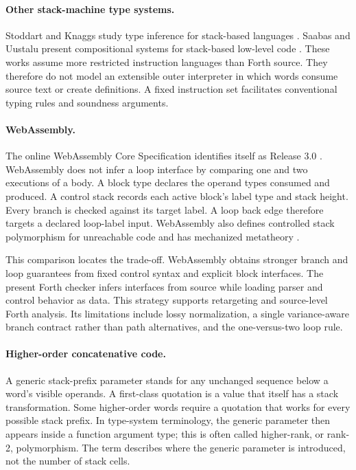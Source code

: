 \documentclass[11pt,a4paper]{article}
\begin{document}
\paragraph{Other stack-machine type systems.}
Stoddart and Knaggs study type inference for stack-based languages
\cite{stoddart1993}.  Saabas and Uustalu present compositional systems for
stack-based low-level code \cite{saabas2006}.  These works assume more
restricted instruction languages than Forth source.  They therefore do not
model an extensible outer interpreter in which words consume source text or
create definitions.  A fixed instruction set facilitates conventional typing
rules and soundness arguments.

\paragraph{WebAssembly.}
The online WebAssembly Core Specification identifies itself as Release 3.0
\cite{wasm3}.  WebAssembly does not infer a loop interface by comparing one and
two executions of a body.  A block type declares the operand types consumed
and produced.  A control stack records each active block's label type and stack
height.  Every branch is checked against its target label.  A loop back edge
therefore targets a declared loop-label input.  WebAssembly also defines
controlled stack polymorphism for unreachable code and has mechanized
metatheory \cite{watt2018,mcdermott2022}.

This comparison locates the trade-off.  WebAssembly obtains stronger branch
and loop guarantees from fixed control syntax and explicit block interfaces.
The present Forth checker infers interfaces from source while loading parser
and control behavior as data.  This strategy supports retargeting and
source-level Forth analysis.  Its limitations include lossy normalization, a
single variance-aware branch contract rather than path alternatives, and the
one-versus-two loop rule.

\paragraph{Higher-order concatenative code.}
A generic stack-prefix parameter stands for any unchanged sequence below a
word's visible operands.  A first-class quotation is a value that itself has a
stack transformation.  Some higher-order words require a quotation that works
for every possible stack prefix.  In type-system terminology, the generic
parameter then appears inside a function argument type; this is often called
higher-rank, or rank-2, polymorphism.  The term describes where the generic
parameter is introduced, not the number of stack cells.
\end{document}
